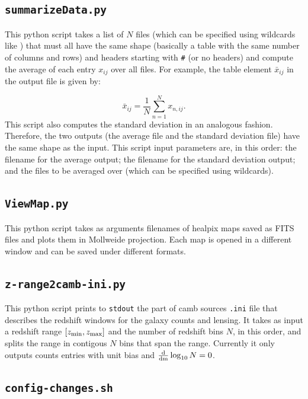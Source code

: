 \documentclass[12pt]{book} %
\begin{document}
\subsection{{\tt summarizeData.py}}
\label{sec:summarizedata}

This {\sc python} script takes a list of $N$ files (which can be specified using wildcards like {\tt *}) 
that must all have the same shape (basically a table with the same number of columns and rows) 
and headers starting with {\tt \#} (or no headers) and compute the average of each entry $x_{ij}$ over all files. 
For example, the table element $\bar{x}_{ij}$ in the output file is given by:

\begin{equation}
\bar{x}_{ij} = \frac{1}{N}\sum_{n=1}^{N}x_{n,ij}.
\label{eq:average}
\end{equation}
This script also computes the standard deviation in an analogous fashion. 
Therefore, the two outputs (the average file and the standard deviation file) have 
the same shape as the input. This script input parameters are, in this order: 
the filename for the average output; the filename for the standard deviation output; 
and the files to be averaged over (which can be specified using wildcards).

\subsection{{\tt ViewMap.py}}
\label{sec:viewmap}

This {\sc python} script takes as arguments filenames of {\sc healpix} maps saved as FITS files 
and plots them in Mollweide projection. Each map is opened in a different window and can be 
saved under different formats.

\subsection{{\tt z-range2camb-ini.py}}
\label{sec:zrange2camb}

This {\sc python} script prints to {\tt stdout} the part of {\sc camb sources} {\tt .ini} file 
that describes the redshift windows for the galaxy counts and lensing. It takes as input a 
redshift range $[z_{\rm{min}}, z_{\rm{max}}]$ and the number of redshift bins $N$, in this order,
and splits the range in contigous $N$ bins that span the range. Currently it only outputs 
counts entries with unit bias and $\frac{\rm{d}}{\rm{d}m}\log_{10}N=0$.   

\subsection{{\tt config-changes.sh}}
\label{sec:config-changes}
\end{document}
